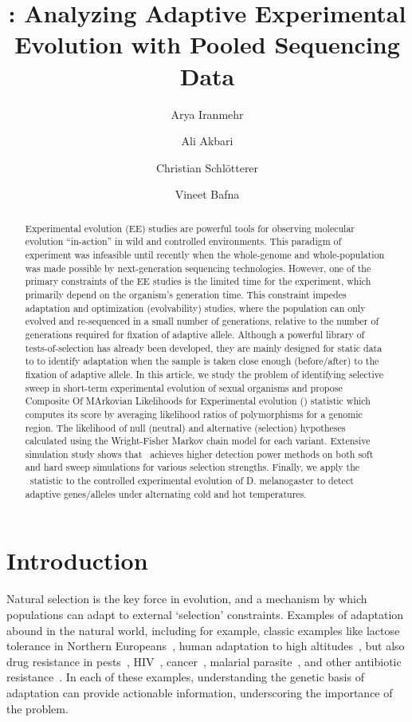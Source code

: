 \documentclass[11pt]{article}
\title{\comale: Analyzing Adaptive Experimental Evolution with Pooled Sequencing Data}
\author[1]{Arya Iranmehr}
\author[1]{Ali Akbari}
\author[2]{Christian Schl\"{o}tterer}
\author[3]{Vineet Bafna}
\affil[1]{\footnotesize Electrical and Computer Engineering, University of California, San Diego, La Jolla, CA 92093, USA.}
\affil[2]{\footnotesize Institut f\"{u}r Populationsgenetik, Vetmeduni, Vienna, Austria.}
\affil[3]{\footnotesize Computer Science \& Engineering, University of California, San Diego, La Jolla, CA 92093, USA}
\date{}
\def\comale{\text{{\sc Comale}}}
\begin{document}
\maketitle
\begin{abstract}
  Experimental evolution (EE) studies are powerful tools for observing
  molecular evolution ``in-action'' in wild and controlled
  environments. This paradigm of experiment was infeasible until
  recently when the whole-genome and whole-population was made
  possible by next-generation sequencing technologies.  However, one
  of the primary constraints of the EE studies is the limited time for
  the experiment, which primarily depend on the organism's generation
  time. This constraint impedes adaptation and optimization
  (evolvability) studies, where the population can only evolved and
  re-sequenced in a small number of generations, relative to the
  number of generations required for fixation of adaptive allele.
  Although a powerful library of tests-of-selection has already been
  developed, they are mainly designed for static data to to identify
  adaptation when the sample is taken close enough (before/after) to
  the fixation of adaptive allele.  In this article, we study the
  problem of identifying selective sweep in short-term experimental
  evolution of sexual organisms and propose Composite Of MArkovian
  Likelihoods for Experimental evolution (\comale) statistic which
  computes its score by averaging likelihood ratios of polymorphisms
  for a genomic region.  The likelihood of null (neutral) and
  alternative (selection) hypotheses calculated using the
  Wright-Fisher Markov chain model for each variant. Extensive
  simulation study shows that \comale\ achieves higher detection power
  methods on both soft and hard sweep simulations for various
  selection strengths.  Finally, we apply the \comale\ statistic to
  the controlled experimental evolution of D. melanogaster to detect
  adaptive genes/alleles under alternating cold and hot temperatures.
\end{abstract}



\section{Introduction}

Natural selection is the key force in evolution, and a mechanism by
which populations can adapt to external `selection'
constraints. Examples of adaptation abound in the natural world,
including for example, classic examples like lactose tolerance in
Northern Europeans~\cite{bersaglieri2004genetic}, human adaptation to high
altitudes~\cite{yi2010sequencing,simonson2010genetic}, but also drug resistance 
in
pests~\cite{daborn2001ddt}, HIV~\cite{Feder2016More},
cancer~\cite{gottesman2002mechanisms,zahreddine2013mechanisms},
malarial parasite~\cite{ariey2014molecular,nair2007recurrent}, and
other antibiotic resistance~\cite{spellberg2008epidemic}. In each of
these examples, understanding the genetic basis of adaptation can
provide actionable information, underscoring the importance of the
problem.
\end{document}
